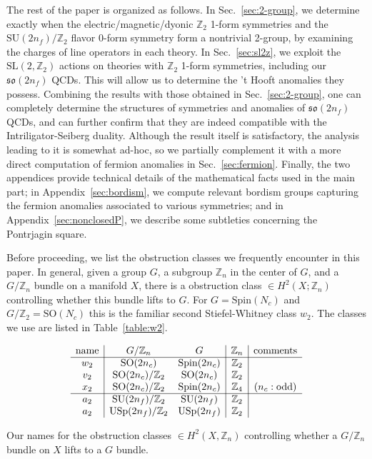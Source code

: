 \documentclass[12pt]{article}
\numberwithin{equation}{section}
\def\bZ{\mathbb{Z}}
\def\SU{\mathrm{SU}}
\def\SO{\mathrm{SO}}
\def\USp{\mathrm{USp}}
\def\so{\mathfrak{so}}
\def\Spin{\mathrm{Spin}}
\def\SL{\mathrm{SL}}
\begin{document}
The rest of the paper is organized as follows.
In Sec.~\ref{sec:2-group},
we determine exactly when the electric/magnetic/dyonic $\bZ_2$ 1-form symmetries
and the $\SU(2n_f)/\bZ_2$ flavor 0-form symmetry form a nontrivial 2-group,
by examining the charges of line operators in each theory.
In Sec.~\ref{sec:sl2z},
we exploit the $\SL(2,\bZ_2)$ actions on theories with $\bZ_2$ 1-form symmetries, including our $\so(2n_f)$ QCDs.
This will allow us to determine the 't Hooft anomalies they possess.
Combining the results with those obtained in Sec.~\ref{sec:2-group},
one can completely determine the structures of symmetries and anomalies of $\so(2n_f)$ QCDs,
and can further confirm that they are indeed compatible with the Intriligator-Seiberg duality.
Although the result itself is satisfactory, the analysis leading to it is somewhat ad-hoc, 
so we partially complement it with a more direct computation of fermion anomalies in Sec.~\ref{sec:fermion}.
Finally, the two appendices provide technical details of the mathematical facts used in the main part;
in Appendix~\ref{sec:bordism}, we compute relevant bordism groups capturing the fermion anomalies associated to various symmetries;
and in Appendix~\ref{sec:nonclosedP}, we describe some subtleties concerning the Pontrjagin square.

Before proceeding, we list the obstruction classes we frequently encounter in this paper.
In general, given a group $G$, a subgroup $\bZ_n$ in the center of $G$,
and a $G/\bZ_n$ bundle on a manifold $X$, 
there is a obstruction class $\in H^2(X; \bZ_n)$ controlling whether this bundle lifts to $G$.
For $G=\Spin(N_c)$ and $G/\bZ_2=\SO(N_c)$ this is the familiar second Stiefel-Whitney class $w_2$.
The classes we use are listed in Table~\ref{table:w2}.

\begin{table}
\[
\begin{array}{c| cc| c|c}
\text{name} & G/\bZ_n & G & \bZ_n & \text{comments}\\
\hline 
w_2 & \SO(2n_c) & \Spin(2n_c) & \bZ_2\\
v_2 & \SO(2n_c)/\bZ_2 & \SO(2n_c) &\bZ_2\\
x_2 & \SO(2n_c)/\bZ_2 & \Spin(2n_c) &\bZ_4 & (n_c:\text{odd})\\
\hline
a_2 & \SU(2n_f)/\bZ_2 & \SU(2n_f) &\bZ_2\\
a_2 & \USp(2n_f)/\bZ_2 & \USp(2n_f) &\bZ_2\\
\end{array}
\]
\caption{Our names for the obstruction classes $\in H^2(X,\bZ_n)$ controlling whether a $G/\bZ_n$ bundle
on $X$ lifts to a $G$ bundle.  \label{table:w2}}
\end{table}
\end{document}
